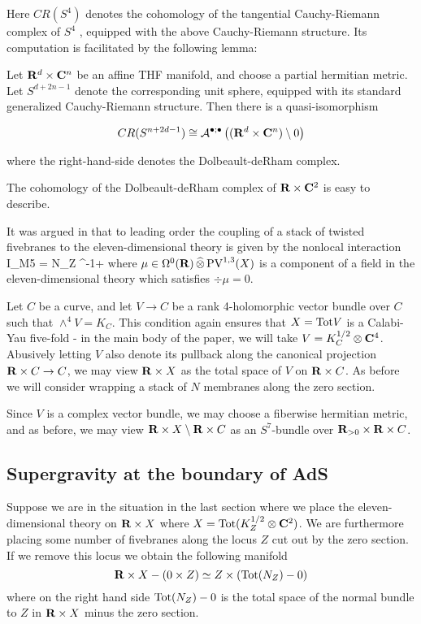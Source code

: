 Here $CR (S^{4})$ denotes the cohomology of the tangential Cauchy-Riemann complex of $S^{4}$ , equipped with the above Cauchy-Riemann structure. Its computation is facilitated by the following lemma:

\begin{lem}
  Let $\mathbf{R}^{d}\times \mathbf{C}^{n}$ be an affine THF manifold, and choose a partial hermitian metric. Let $S^{d+2n-1}$ denote the corresponding unit sphere, equipped with its standard generalized Cauchy-Riemann structure. Then there is a quasi-isomorphism

  \[CR (S^{n+2d-1})\cong \mathcal A^{\bullet;\bullet}\left ( (\mathbf{R}^{d}\times \mathbf{C}^{n})\setminus 0 \right )\]

  where the right-hand-side denotes the Dolbeault-deRham complex.
\end{lem}

The cohomology of the Dolbeault-deRham complex of $\mathbf{R}\times \mathbf{C}^{2}$ is easy to describe.


It was argued in \cite{RSW} that to leading order the coupling of a stack of twisted fivebranes to the eleven-dimensional theory is given by the nonlocal interaction 
\beqn\label{eqn:br1}
I_{M5} = N\int_{Z} \div^{-1}\mu \vee \Omega +\cdots 
\eeqn
where $\mu \in \Omega^0 (\mathbf{R}) \, \widehat{\otimes} \, {\rm PV}^{1,3}(X)$ is a component of a field in the eleven-dimensional theory which satisfies $\div \mu = 0$.

\parsec
Let $C$ be a curve, and let $V\to C$ be a rank 4-holomorphic vector bundle over $C$ such that $\wedge^{4} V = K_{C}$. This condition again ensures that $X = {\rm Tot} V$ is a Calabi-Yau five-fold - in the main body of the paper, we will take $V = K^{1/2}_{C}\otimes \mathbf{C}^{4}$. Abusively letting $V$ also denote its pullback along the canonical projection $\mathbf{R}\times C \to C$, we may view $\mathbf{R}\times X$ as the total space of $V$ on $\mathbf{R}\times C$. As before we will consider wrapping a stack of $N$ membranes along the zero section.

Since $V$ is a complex vector bundle, we may choose a fiberwise hermitian metric, and as before, we may view $\mathbf{R}\times X \setminus \mathbf{R}\times C$ as an $S^{7}$-bundle over $\mathbf{R}_{>0}\times \mathbf{R}\times C$.




\subsection{Supergravity at the boundary of AdS}

Suppose we are in the situation in the last section where we place the eleven-dimensional theory on $\mathbf{R} \times X$ where $X = {\rm Tot}(K^{1/2}_Z \otimes \mathbf{C}^2)$. 
We are furthermore placing some number of fivebranes along the locus $Z$ cut out by the zero section. 
If we remove this locus we obtain the following manifold 
\[
\mathbf{R} \times X - \left(0 \times Z\right) \simeq Z \times \left({\rm Tot}(N_Z) - 0\right) 
\]
where on the right hand side ${\rm Tot}(N_Z) - 0$ is the total space of the normal bundle to $Z$ in $\mathbf{R} \times X$ minus the zero section.


